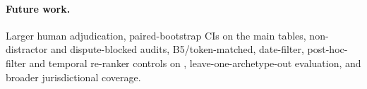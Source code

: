 \paragraph{Future work.}
Larger human adjudication, paired-bootstrap CIs on the main tables, non-distractor and dispute-blocked audits, B5/token-matched, date-filter, post-hoc-filter and temporal re-ranker controls on \plre{}, leave-one-archetype-out evaluation, and broader jurisdictional coverage.
